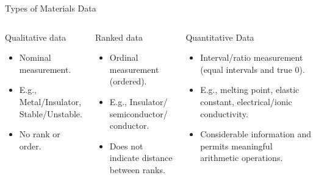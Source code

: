 \documentclass[aspectratio=169]{beamer}
\begin{document}
\begin{frame}[t]{Types of Materials Data}
\begin{columns}[t]
\begin{exampleblock}{Qualitative data}
\begin{itemize}
    \item Nominal measurement.
    \item E.g., Metal/Insulator, Stable/Unstable.
    \item No rank or order.
\end{itemize}
\end{exampleblock}
\begin{exampleblock}{Ranked data}
\begin{itemize}
    \item Ordinal measurement (ordered).
    \item E.g., Insulator/ semiconductor/ conductor.
    \item Does not indicate distance between ranks.
\end{itemize}
\end{exampleblock}
\begin{exampleblock}{Quantitative Data
}
\begin{itemize}
    \item Interval/ratio measurement (equal intervals and true 0).
    \item E.g., melting point, elastic constant, electrical/ionic conductivity.
    \item Considerable information and permits meaningful arithmetic operations.
\end{itemize}
\end{exampleblock}
\end{columns}
\end{frame}
\end{document}
